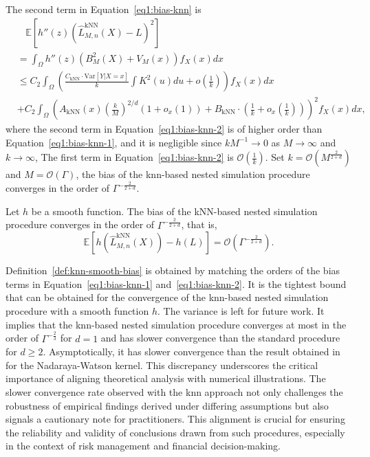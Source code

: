 The second term in Equation~\eqref{eq1:bias-knn} is 
\begin{align}\label{eq1:bias-knn-2}
    & ~~~~ \mathbb{E} \left[ h''(z) \left( \hat{L}^{\text{kNN}}_{M, n}(X) - L \right)^2 \right]  \nonumber \\
    & = \int_{\Omega} h''(z) \left(B_M^2(X) + V_M(x)\right) f_X(x) dx \nonumber \\
    & \leq C_2 \int_{\Omega} \left( \frac{C_{\text{kNN}} \cdot \text{Var}[Y| X = x]}{k} \int K^2(u) du + o\left(\frac{1}{k}\right) \right) f_X(x) dx \nonumber \\
    & + C_2 \int_{\Omega} \left( A_{\text{kNN}}(x) \left(\frac{k}{M}\right)^{2/d} \left(1+o_x(1)\right) + B_{\text{kNN}} \cdot \left(\frac{1}{k} + o_x\left(\frac{1}{k}\right)\right) \right)^2 f_X(x) dx,
\end{align}
where the second term in Equation~\eqref{eq1:bias-knn-2} is of higher order than Equation~\eqref{eq1:bias-knn-1}, and it is negligible since $kM^{-1} \to 0$ as $M \to \infty$ and $k \to \infty$, 
The first term in Equation~\eqref{eq1:bias-knn-2} is $\mathcal{O}\left(\frac{1}{k}\right)$.
Set $k = \mathcal{O}(M^{\frac{2}{2+d}})$ and $M = \mathcal{O}(\Gamma)$, the bias of the \gls{knn}-based nested simulation procedure converges in the order of $\Gamma^{-\frac{2}{2+d}}$.

\begin{definition}\label{def:knn-smooth-bias}
    Let $h$ be a smooth function. 
    The bias of the kNN-based nested simulation procedure converges in the order of $\Gamma^{-\frac{2}{2+d}}$, that is,
    $$ \mathbb{E} \left[ h(\hat{L}^{\text{kNN}}_{M, n}(X)) - h(L) \right]  = \mathcal{O}(\Gamma^{-\frac{2}{2+d}}).$$
\end{definition}

Definition~\ref{def:knn-smooth-bias} is obtained by matching the orders of the bias terms in Equation~\eqref{eq1:bias-knn-1} and~\ref{eq1:bias-knn-2}.
It is the tightest bound that can be obtained for the convergence of the \gls{knn}-based nested simulation procedure with a smooth function $h$.
The variance is left for future work.
It implies that the \gls{knn}-based nested simulation procedure converges at most in the order of $\Gamma^{-\frac{2}{3}}$ for $d = 1$ and has slower convergence than the standard procedure for $d \geq 2$.
Asymptotically, it has slower convergence than the result obtained in~\cite{hong2017kernel} for the Nadaraya-Watson kernel.
This discrepancy underscores the critical importance of aligning theoretical analysis with numerical illustrations.
The slower convergence rate observed with the \gls{knn} approach not only challenges the robustness of empirical findings derived under differing assumptions but also signals a cautionary note for practitioners. 
This alignment is crucial for ensuring the reliability and validity of conclusions drawn from such procedures, especially in the context of risk management and financial decision-making.


